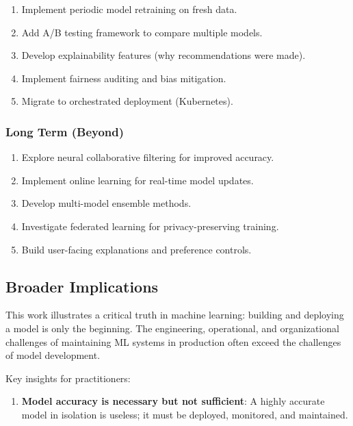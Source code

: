 \begin{enumerate}
\begin{enumerate}
  \item Implement periodic model retraining on fresh data.
  
  \item Add A/B testing framework to compare multiple models.
  
  \item Develop explainability features (why recommendations were made).
  
  \item Implement fairness auditing and bias mitigation.
  
  \item Migrate to orchestrated deployment (Kubernetes).
\end{enumerate}

\subsubsection{Long Term (Beyond)}

\begin{enumerate}
  \item Explore neural collaborative filtering for improved accuracy.
  
  \item Implement online learning for real-time model updates.
  
  \item Develop multi-model ensemble methods.
  
  \item Investigate federated learning for privacy-preserving training.
  
  \item Build user-facing explanations and preference controls.
\end{enumerate}

\subsection{Broader Implications}

This work illustrates a critical truth in machine learning: building and deploying a model is only the 
beginning. The engineering, operational, and organizational challenges of maintaining ML systems in production 
often exceed the challenges of model development.

Key insights for practitioners:

\begin{enumerate}
  \item \textbf{Model accuracy is necessary but not sufficient}: A highly accurate model in isolation is useless; 
  it must be deployed, monitored, and maintained.
  

\end{enumerate}
\end{enumerate}
